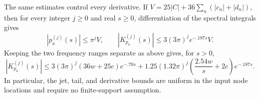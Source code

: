The same estimates control every derivative.  If
\(V=25|C|+36\sum_n(|c_n|+|d_n|)\), then for every integer \(j\ge0\) and real
\(s\ge0\), differentiation of the spectral integrals gives
\begin{equation}\label{eq:uniform-derivative-bounds}
 |p_a^{(j)}(s)|\le\pi^jV,\qquad
 |K_{p_a}^{(j)}(s)|\le3(3\pi)^j e^{-.187s}V.
\end{equation}
Keeping the two frequency ranges separate as above gives, for \(s>0\),
\begin{equation}\label{eq:refined-derivative-bound}
 |K_{p_a}^{(j)}(s)|
 \le3(3\pi)^j(36w+25c)e^{-.70s}
    +1.25(1.32\pi)^j
          \left(\frac{2.54w}{s}+2c\right)e^{-.187s}.
\end{equation}
In particular, the jet, tail, and derivative bounds are uniform in the input
node locations and require no finite-support assumption.
